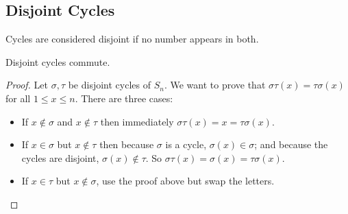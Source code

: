 \subsection{Disjoint Cycles}
Cycles are considered disjoint if no number appears in both.
\begin{lemma}
	Disjoint cycles commute.
\end{lemma}
\begin{proof}
	Let \(\sigma, \tau\) be disjoint cycles of \(S_n\).
	We want to prove that \(\sigma\tau(x) = \tau\sigma(x)\) for all \(1 \leq x \leq n\).
	There are three cases:
	\begin{itemize}
		\item If \(x \notin \sigma\) and \(x \notin \tau\) then immediately \(\sigma\tau(x) = x = \tau\sigma(x)\).
		\item If \(x \in \sigma\) but \(x \notin \tau\) then because \(\sigma\) is a cycle, \(\sigma(x) \in \sigma\); and because the cycles are disjoint, \(\sigma(x) \notin \tau\).
		      So \(\sigma\tau(x) = \sigma(x) = \tau\sigma(x)\).
		\item If \(x \in \tau\) but \(x \notin \sigma\), use the proof above but swap the letters.
	\end{itemize}
\end{proof}

